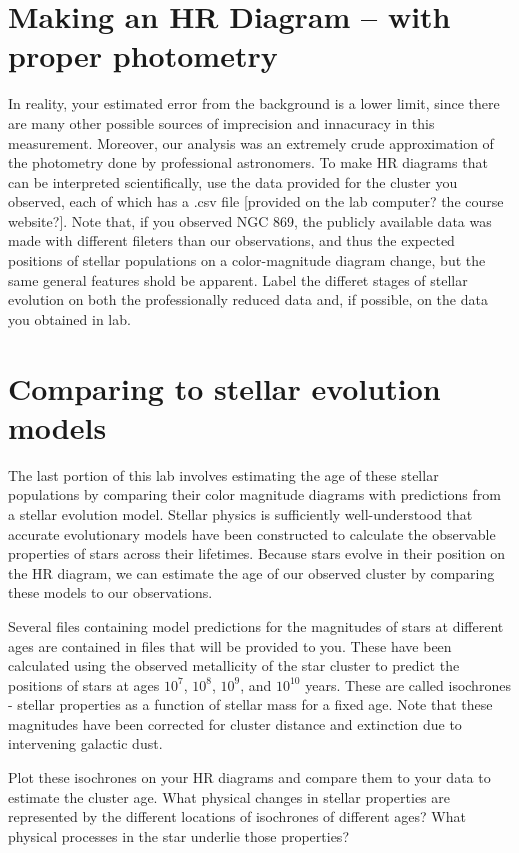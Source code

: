 \section{Making an HR Diagram -- with proper photometry}

In reality, your estimated error from the background is a lower limit, since there are many other possible sources of imprecision and innacuracy in this measurement. Moreover, our analysis was an extremely crude approximation of the photometry done by professional astronomers. To make HR diagrams that can be interpreted scientifically, use the data provided for the cluster you observed, each of which has a .csv file [provided on the lab computer? the course website?]. Note that, if you observed NGC 869, the publicly available data was made with different fileters than our observations, and thus the expected positions of stellar populations on a color-magnitude diagram change, but the same general features shold be apparent. Label the differet stages of stellar evolution on both the professionally reduced data and, if possible, on the data you obtained in lab.   

\section{Comparing to stellar evolution models}

The last portion of this lab involves estimating the age of these stellar populations by comparing their color magnitude diagrams with predictions from a stellar evolution model. Stellar physics is sufficiently well-understood that accurate evolutionary models have been constructed to calculate the observable properties of stars across their lifetimes. Because stars evolve in their position on the HR diagram, we can estimate the age of our observed cluster by comparing these models to our observations.

Several files containing model predictions for the magnitudes of stars at different ages are contained in files that will be provided to you. These have been calculated using the observed metallicity of the star cluster to predict the positions of stars at ages $10^7$, $10^8$, $10^9$, and $10^{10}$ years. These are called isochrones - stellar properties as a function of stellar mass for a fixed age. Note that these magnitudes have been corrected for cluster distance and extinction due to intervening galactic dust.

Plot these isochrones on your HR diagrams and compare them to your data to estimate the cluster age. What physical changes in stellar properties are represented by the different locations of isochrones of different ages? What physical processes in the star underlie those properties?


